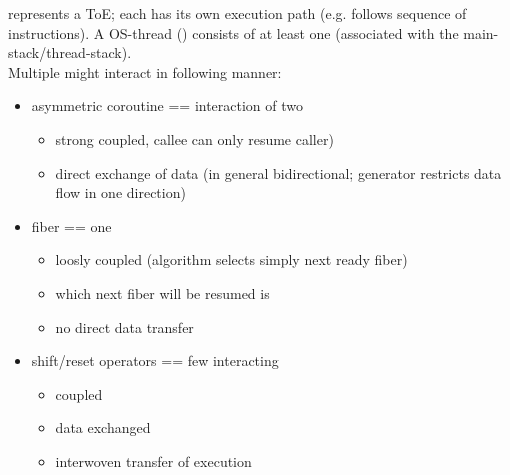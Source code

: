 \label{appendixb}
\ectx represents a ToE; each \ectx has its own execution path (e.g. follows
sequence of instructions). A OS-thread () consists of at least
one \ectx (associated with the main-stack/thread-stack).\\
Multiple \ectx might interact in following manner:
\begin{itemize}
\item asymmetric coroutine == interaction of two \ectx
    \begin{itemize}
        \item strong coupled, callee \ectx can only resume caller)
        \item direct exchange of data (in general bidirectional; generator
              restricts data flow in one direction)
    \end{itemize}
\item fiber == one \ectx
    \begin{itemize}
        \item loosly coupled (algorithm selects simply next ready fiber)
        \item which next fiber will be resumed is 
        \item no direct data transfer
    \end{itemize}
\item shift/reset operators == few interacting \ectx
    \begin{itemize}
        \item coupled
        \item data exchanged
        \item interwoven transfer of execution
    \end{itemize}
\end{itemize}
